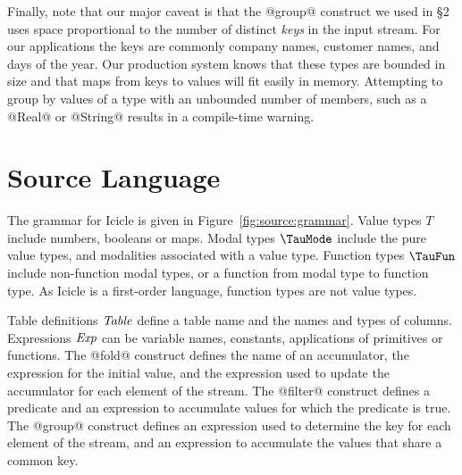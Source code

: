 Finally, note that our major caveat is that the @group@ construct we used in \S2 uses space proportional to the number of distinct \emph{keys} in the input stream.
For our applications the keys are commonly company names, customer names, and days of the year.
Our production system knows that these types are bounded in size and that maps from keys to values will fit easily in memory.
Attempting to group by values of a type with an unbounded number of members, such as a @Real@ or @String@ results in a compile-time warning.




\eject
\section{Source Language}
\label{s:IcicleSource}





The grammar for Icicle is given in Figure~\ref{fig:source:grammar}.
Value types $T$ include numbers, booleans or maps.
Modal types $\TauMode$ include the pure value types, and modalities associated with a value type.
Function types $\TauFun$ include non-function modal types, or a function from modal type to function type.
As Icicle is a first-order language, function types are not value types.

Table definitions $\mathit{Table}$ define a table name and the names and types of columns.
Expressions $\mathit{Exp}$ can be variable names, constants, applications of primitives or functions.
The @fold@ construct defines the name of an accumulator, the expression for the initial value, and the expression used to update the accumulator for each element of the stream.
The @filter@ construct defines a predicate and an expression to accumulate values for which the predicate is true.
The @group@ construct defines an expression used to determine the key for each element of the stream, and an expression to accumulate the values that share a common key.

